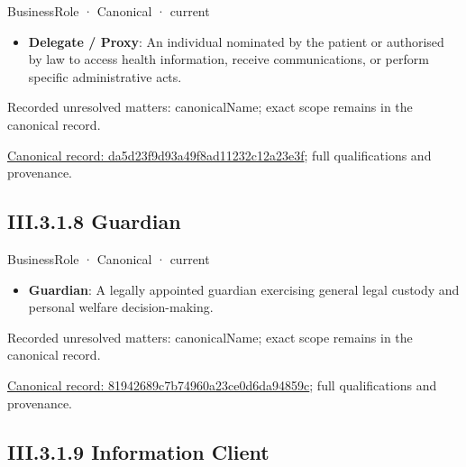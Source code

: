 \label{element:da5d23f9d93a49f8ad11232c12a23e3f}
{\small BusinessRole · Canonical · current}\par

\begin{itemize}


\item \textbf{Delegate / Proxy}: An individual nominated by the patient or authorised by law to access health information, receive communications, or perform specific administrative acts.

\end{itemize}

{\small Recorded unresolved matters: canonicalName; exact scope remains in the canonical record.}\par
{\footnotesize \href{../../../../../../../continuum/business/business-role/da5d23f9d93a49f8ad11232c12a23e3f.md}{Canonical record: da5d23f9d93a49f8ad11232c12a23e3f}; full qualifications and provenance.}\par
\subsection*{III.3.1.8 Guardian}
\label{navigation:III.3.1.8}

\label{element:81942689c7b74960a23ce0d6da94859c}
{\small BusinessRole · Canonical · current}\par

\begin{itemize}


\item \textbf{Guardian}: A legally appointed guardian exercising general legal custody and personal welfare decision-making.

\end{itemize}

{\small Recorded unresolved matters: canonicalName; exact scope remains in the canonical record.}\par
{\footnotesize \href{../../../../../../../continuum/business/business-role/81942689c7b74960a23ce0d6da94859c.md}{Canonical record: 81942689c7b74960a23ce0d6da94859c}; full qualifications and provenance.}\par
\subsection*{III.3.1.9 Information Client}
\label{navigation:III.3.1.9}

